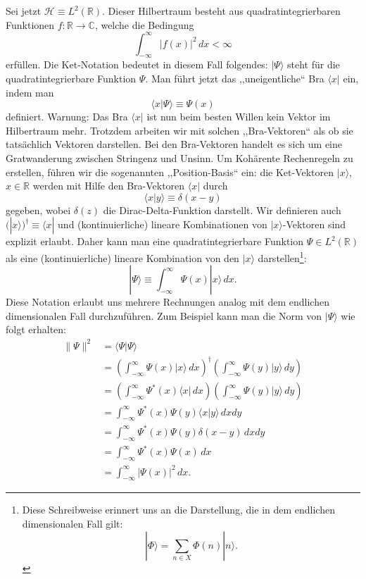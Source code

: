 Sei jetzt $\mathcal{H}\equiv L^2(\mathbb{R})$. Dieser Hilbertraum besteht aus quadratintegrierbaren Funktionen $f:\mathbb{R}\rightarrow\mathbb{C}$, welche die Bedingung
\begin{equation}
	\int_{-\infty}^{\infty} |f(x)|^2\,dx < \infty
\end{equation}
erfüllen. Die Ket-Notation bedeutet in diesem Fall folgendes: $|\Psi\rangle$ steht für die quadratintegrierbare Funktion $\Psi$. Man führt jetzt das ,,uneigentliche`` Bra $\langle x|$ ein, indem man 
\begin{equation}
	\langle x|\Psi\rangle \equiv \Psi(x)
\end{equation}
definiert. Warnung: Das Bra $\langle x|$ ist nun beim besten Willen kein Vektor im Hilbertraum mehr. Trotzdem arbeiten wir mit solchen ,,Bra-Vektoren`` als ob sie tatsächlich Vektoren darstellen. Bei den Bra-Vektoren handelt es sich um eine Gratwanderung zwischen Stringenz und Unsinn. Um Kohärente Rechenregeln zu erstellen, führen wir die  sogenannten ,,Position-Basis`` ein: die Ket-Vektoren $|x\rangle$, $x\in \mathbb{R}$ werden mit Hilfe den Bra-Vektoren $\langle x|$ durch
\begin{equation}
	\langle x|y\rangle \equiv \delta(x-y)
\end{equation}
gegeben, wobei $\delta(z)$ die Dirac-Delta-Funktion darstellt. Wir definieren auch $(|x\rangle)^\dag\equiv \langle x|$ und (kontinuierliche) lineare Kombinationen von $|x\rangle$-Vektoren sind explizit erlaubt. Daher kann man eine quadratintegrierbare Funktion $\Psi \in L^2(\mathbb{R})$ als eine (kontinuierliche) lineare Kombination von den $|x\rangle$ darstellen\footnote{Diese Schreibweise erinnert uns an die Darstellung, die in dem endlichen dimensionalen Fall gilt:
\begin{equation}
	|\Phi\rangle = \sum_{n\in X} \Phi(n)|n\rangle.
\end{equation}}:
\begin{equation}
	|\Psi\rangle \equiv \int_{-\infty}^{\infty} \Psi(x)|x\rangle \, dx.
\end{equation}
Diese Notation erlaubt uns mehrere Rechnungen analog mit dem endlichen dimensionalen Fall durchzuführen. Zum Beispiel kann man die Norm von $|\Psi\rangle$ wie folgt erhalten:
\begin{equation}
	\begin{split}
		\|\Psi\|^2 &= \langle \Psi|\Psi\rangle \\
		&= \left(\int_{-\infty}^{\infty} \Psi(x)|x\rangle \, dx\right)^\dag \left(\int_{-\infty}^{\infty} \Psi(y)|y\rangle \, dy\right) \\
		&= \left(\int_{-\infty}^{\infty} \Psi^*(x) \langle x| \, dx\right)\left(\int_{-\infty}^{\infty} \Psi(y)|y\rangle \, dy\right) \\
		&= \int_{-\infty}^{\infty} \Psi^*(x)\Psi(y) \langle x|y\rangle\,dxdy \\
		&= \int_{-\infty}^{\infty} \Psi^*(x)\Psi(y) \delta(x-y)\,dxdy\\
		&= \int_{-\infty}^{\infty} \Psi^*(x)\Psi(x) \,dx \\
		&= \int_{-\infty}^{\infty} |\Psi(x)|^2 \,dx.
	\end{split}
\end{equation} 

